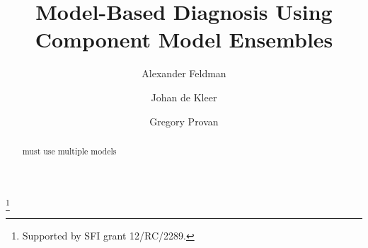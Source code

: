 \documentclass{ifacconf}
\begin{document}
\begin{frontmatter}

\title{Model-Based Diagnosis Using Component Model Ensembles}
\thanks[footnoteinfo]{Supported by SFI grant 12/RC/2289.}
\author[First]{Alexander Feldman}
\author[Second]{Johan de Kleer}
\address[First]{PARC Inc., Palo Alto 94304, California, USA}
\author[Third]{Gregory Provan}
\address[Third]{Department of Computer Science, University College Cork, Cork, Ireland (Tel: 353-21-490-1816; e-mail: g.provan@ cs.ucc.ie).}

\begin{abstract}
must use multiple models
\end{abstract}
\end{frontmatter}





%


\end{document}
